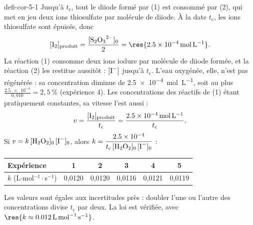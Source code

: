 \begin{blocEdition}{defi-cor-5-1}
Jusqu'à $t_\mathrm{c}$, tout le diiode formé par (1) est consommé par (2), qui met en jeu deux ions thiosulfate par
molécule de diiode. À la date $t_\mathrm{c}$, les ions thiosulfate sont épuisés, donc
\[[\ce{I2}]_\text{produit}=\frac{[\ce{S2O3^2-}]_0}{2}=\res{\qty{2,5e-4}{mol.L^{-1}}}.\]
La réaction (1) consomme deux ions iodure par molécule de diiode formée, et la réaction (2) les restitue aussitôt :
$[\ce{I-}]$  jusqu'à $t_\mathrm{c}$. L'eau oxygénée, elle, n'est pas
régénérée : sa concentration diminue de \qty{2,5e-4}{mol.L^{-1}}, soit au plus $\frac{\num{2.5e-4}}{0{,}010}=2{,}5~\%$
(expérience 4). Les concentrations des réactifs de (1) étant pratiquement constantes, sa vitesse l'est aussi :
\[v=\frac{[\ce{I2}]_\text{produit}}{t_\mathrm{c}}=\frac{\qty{2,5e-4}{mol.L^{-1}}}{t_\mathrm{c}}.\]
Si $v=k\,[\ce{H2O2}]_0\,[\ce{I-}]_0$, alors $k=\dfrac{\num{2.5e-4}}{t_\mathrm{c}\,[\ce{H2O2}]_0\,[\ce{I-}]_0}$ :
\begin{center}\small\renewcommand{\arraystretch}{1.2}
\begin{tabular}{@{}l*{5}{c}@{}}\toprule
Expérience & 1 & 2 & 3 & 4 & 5\\\midrule
$k$ (L$\cdot$mol$^{-1}\cdot$s$^{-1}$) & 0,0120 & 0,0120 & 0,0116 & 0,0121 & 0,0119\\\bottomrule
\end{tabular}\end{center}
Les valeurs sont égales aux incertitudes près : doubler l'une ou l'autre des concentrations divise $t_\mathrm{c}$ par
deux. La loi est vérifiée, avec $\res{k\approx\qty{0,012}{L.mol^{-1}.s^{-1}}}$.
\label{figedition-defi-cor-5-1-1}
\end{blocEdition}

